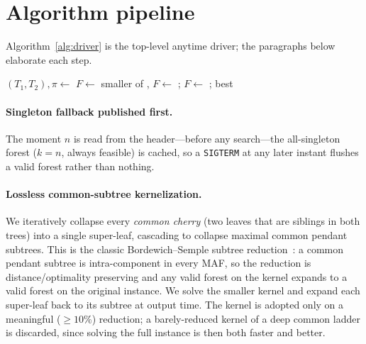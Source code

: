 \documentclass[a4paper,UStitle,numberwithinsect=false,autoref]{lipics-v2021}
\begin{document}
\section{Algorithm pipeline}

Algorithm~\ref{alg:driver} is the top-level anytime driver; the paragraphs below
elaborate each step.

\begin{algorithm}[H]\footnotesize
\setlength{\intextsep}{5pt plus 2pt minus 2pt}
\DontPrintSemicolon
{}
$(T_1,T_2),\pi \leftarrow$ 
$F \leftarrow$ smaller of , \;
$F \leftarrow$ ;\quad {}
$F \leftarrow$ ;\quad {}
\Return best
\caption{Anytime rooted-MAF heuristic (single worker thread, $1$\,GiB stack).
\textnormal{\textsc{publishIfBetter}$(F)$ installs $F$ as the new best iff $F$ is feasible
and $k(F)$ strictly improves.}}
\label{alg:driver}
\end{algorithm}

\paragraph{Singleton fallback published first.} The moment $n$ is read from the
header---before any search---the all-singleton forest ($k=n$, always feasible) is
cached, so a \texttt{SIGTERM} at any later instant flushes a valid forest rather than
nothing.

\paragraph{Lossless common-subtree kernelization.} We iteratively collapse every
\emph{common cherry} (two leaves that are siblings in both trees) into a single
super-leaf, cascading to collapse maximal common pendant subtrees. This is the
classic Bordewich--Semple subtree reduction~\cite{BordewichSemple2005}: a common
pendant subtree is intra-component in every MAF, so the reduction is
distance/optimality preserving and any valid forest on the kernel expands to a
valid forest on the original instance. We solve the smaller kernel and expand each
super-leaf back to its subtree at output time. The kernel is adopted only on a
meaningful ($\ge 10\%$) reduction; a barely-reduced kernel of a deep common ladder is
discarded, since solving the full instance is then both faster and better.
\end{document}
